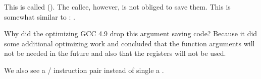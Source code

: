 This is called  (\ARMPCS).
The callee, however, is not obliged to save them.
This is somewhat similar to : .

Why did the optimizing GCC 4.9 drop this argument saving code?
Because it did some additional optimizing work and concluded
that the function arguments will not be needed in the future 
and also that the registers  will not be used.


We also see a / instruction pair instead of single a .
